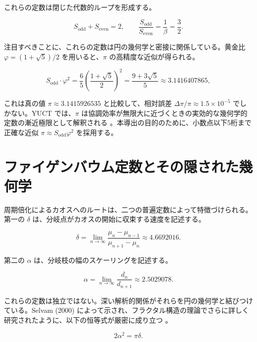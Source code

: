 \documentclass[11pt,a4paper]{article}
\begin{document}
	これらの定数は閉じた代数的ループを形成する。
	
	\begin{equation}
		S_{\mathrm{odd}} + S_{\mathrm{even}} = 2, \qquad \frac{S_{\mathrm{odd}}}{S_{\mathrm{even}}} = \frac{1}{\beta} = \frac{3}{2}.
	\end{equation}
	
	注目すべきことに、これらの定数は円の幾何学と密接に関係している。黄金比 \(\varphi = (1+\sqrt{5})/2\) を用いると、\(\pi\) の高精度な近似が得られる。
	
	\begin{equation}
		S_{\mathrm{odd}} \cdot \varphi^2 = \frac{6}{5} \left( \frac{1+\sqrt{5}}{2} \right)^2 = \frac{9+3\sqrt{5}}{5} \approx 3.1416407865,
	\end{equation}
	
	これは真の値 \(\pi \approx 3.1415926535\) と比較して、相対誤差 \(\Delta\pi/\pi \approx 1.5 \times 10^{-5}\) でしかない。YUCT では、\(\pi\) は協調効率が無限大に近づくときの実効的な幾何学的定数の漸近極限として解釈される \cite{AppendixEhrenfest}。本導出の目的のために、小数点以下5桁まで正確な近似 \(\pi \approx S_{\mathrm{odd}}\varphi^2\) を採用する。
	
	\section{ファイゲンバウム定数とその隠された幾何学}
	
	周期倍化によるカオスへのルートは、二つの普遍定数によって特徴づけられる。第一の \(\delta\) は、分岐点がカオスの開始に収束する速度を記述する。
	
	\begin{equation}
		\delta = \lim_{n\to\infty} \frac{\mu_n - \mu_{n-1}}{\mu_{n+1} - \mu_n} \approx 4.6692016.
	\end{equation}
	
	第二の \(\alpha\) は、分岐枝の幅のスケーリングを記述する。
	
	\begin{equation}
		\alpha = \lim_{n\to\infty} \frac{d_n}{d_{n+1}} \approx 2.5029078.
	\end{equation}
	
	これらの定数は独立ではない。深い解析的関係がそれらを円の幾何学と結びつけている。Selvam (2000) によって示され、フラクタル構造の理論でさらに詳しく研究されたように、以下の恒等式が厳密に成り立つ \cite{Selvam2000}。
	
	\begin{equation}
		2\alpha^2 = \pi \delta.
		\label{eq:feigenbaum-pi}
	\end{equation}
	
\end{document}
